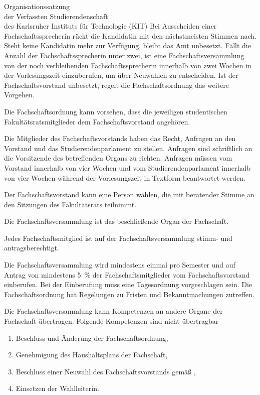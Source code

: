 \begin{jurdoc}[Organisationssatzung]{Organisationssatzung\\der Verfassten Studierendenschaft\\des Karlsruher Instituts für Technologie (KIT)}
Bei Ausscheiden einer Fach\-schafts\-sprecherin rückt die Kandidatin mit den nächstmeisten Stimmen nach. Steht keine Kandidatin mehr zur Verfügung, bleibt das Amt unbesetzt. Fällt die Anzahl der Fach\-schafts\-sprecherin unter zwei, ist eine Fach\-schafts\-versammlung von der noch verbleibenden Fach\-schafts\-sprecherin innerhalb von zwei Wochen in der Vorlesungszeit einzuberufen, um über Neuwahlen zu entscheiden. Ist der Fach\-schafts\-vorstand unbesetzt, regelt die Fach\-schafts\-ordnung das weitere Vorgehen.

Die Fach\-schafts\-ordnung kann vorsehen, dass die jeweiligen studentischen Fakultätsratsmitglieder dem Fachschaftsvorstand angehören.

Die Mitglieder des Fachschaftsvorstands haben das Recht, Anfragen an den  Vorstand und das Studierendenparlament zu stellen. Anfragen sind  schriftlich an die Vorsitzende des betreffenden Organs zu richten.  Anfragen müssen vom Vorstand innerhalb von vier Wochen und vom Studierendenparlament innerhalb von vier Wochen während der Vorlesungszeit in Textform beantwortet werden.

Der Fachschaftsvorstand kann eine Person wählen, die mit beratender Stimme an den Sitzungen des Fakultätsrats teilnimmt.


\label{fachschaft:vv}

Die Fachschaftsversammlung ist das beschließende Organ der Fachschaft.

Jedes Fachschaftsmitglied ist auf der Fachschaftsversammlung stimm- und antragsberechtigt.

Die Fachschaftsversammlung wird mindestens einmal pro Semester und auf Antrag von mindestens 5~\% der Fach\-schaftsmitglieder vom Fachschaftsvorstand einberufen. Bei der Einberufung muss eine Tagesordnung vorgeschlagen sein. Die Fachschaftsordnung hat Regelungen zu Fristen und Bekanntmachungen zutreffen.

Die Fachschaftsversammlung kann Kompetenzen an andere Organe der Fachschaft übertragen. Folgende Kompetenzen sind nicht übertragbar \label{fachschaft:vv:kompetenzen}
  \begin{enumerate}
  \item Beschluss und Änderung der Fachschaftsordnung,
  \item Genehmigung des Haushaltsplans der Fachschaft,
  \item Beschluss einer Neuwahl des Fachschaftsvorstands gemäß , \label{fachschaft:vv:kompetenzen:abwahl}
  \item Einsetzen der Wahlleiterin.\label{fachschaft:vv:wahlleiter}
  \end{enumerate}


\end{jurdoc}

